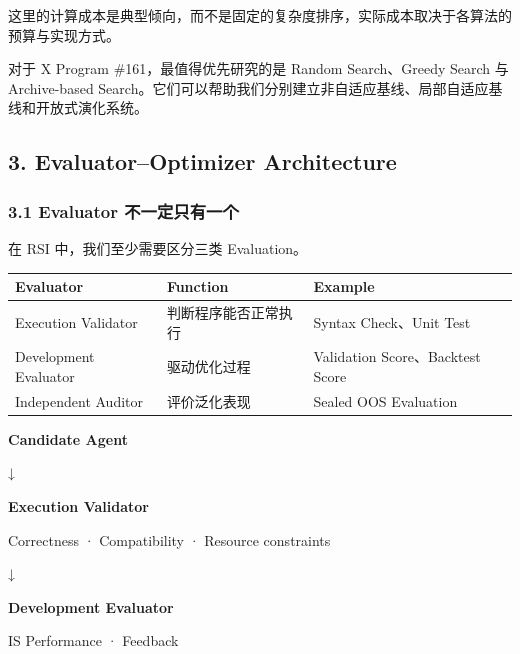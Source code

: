 这里的计算成本是典型倾向，而不是固定的复杂度排序，实际成本取决于各算法的预算与实现方式。

对于 X Program \#161，最值得优先研究的是 Random Search、Greedy Search 与 Archive-based Search。它们可以帮助我们分别建立非自适应基线、局部自适应基线和开放式演化系统。

\hypertarget{part-3-40-0001-evaluatoroptimizer-architecture}{%
\subsection{3. Evaluator--Optimizer Architecture}\label{part-3-40-0001-evaluatoroptimizer-architecture}}

\hypertarget{part-3-40-0001-evaluator-ux4e0dux4e00ux5b9aux53eaux6709ux4e00ux4e2a}{%
\subsubsection{3.1 Evaluator 不一定只有一个}\label{part-3-40-0001-evaluator-ux4e0dux4e00ux5b9aux53eaux6709ux4e00ux4e2a}}

在 RSI 中，我们至少需要区分三类 Evaluation。

\begin{readertable}
\begin{longtable}[]{@{}
  >{\raggedright\arraybackslash}p{}
  >{\raggedright\arraybackslash}p{}
  >{\raggedright\arraybackslash}p{}@{}}
\toprule
Evaluator & Function & Example \\
\midrule
\endhead
Execution Validator & 判断程序能否正常执行 & Syntax Check、Unit Test \\
Development Evaluator & 驱动优化过程 & Validation Score、Backtest Score \\
Independent Auditor & 评价泛化表现 & Sealed OOS Evaluation \\
\bottomrule
\end{longtable}
\end{readertable}

\textbf{Candidate Agent}

↓

\textbf{Execution Validator}

Correctness · Compatibility · Resource constraints

↓

\textbf{Development Evaluator}

IS Performance · Feedback

